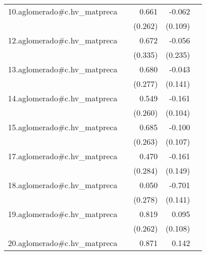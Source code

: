 {\begin{longtable}{l*{4}{D{.}{.}{-1}}}
\addlinespace
10.aglomerado#c.hv\_matpreca&                     &       0.661\sym{*}  &      -0.062         &                     \\
            &                     &     (0.262)         &     (0.109)         &                     \\
\addlinespace
12.aglomerado#c.hv\_matpreca&                     &       0.672\sym{*}  &      -0.056         &                     \\
            &                     &     (0.335)         &     (0.235)         &                     \\
\addlinespace
13.aglomerado#c.hv\_matpreca&                     &       0.680\sym{*}  &      -0.043         &                     \\
            &                     &     (0.277)         &     (0.141)         &                     \\
\addlinespace
14.aglomerado#c.hv\_matpreca&                     &       0.549\sym{*}  &      -0.161         &                     \\
            &                     &     (0.260)         &     (0.104)         &                     \\
\addlinespace
15.aglomerado#c.hv\_matpreca&                     &       0.685\sym{**} &      -0.100         &                     \\
            &                     &     (0.263)         &     (0.107)         &                     \\
\addlinespace
17.aglomerado#c.hv\_matpreca&                     &       0.470         &      -0.161         &                     \\
            &                     &     (0.284)         &     (0.149)         &                     \\
\addlinespace
18.aglomerado#c.hv\_matpreca&                     &       0.050         &      -0.701\sym{***}&                     \\
            &                     &     (0.278)         &     (0.141)         &                     \\
\addlinespace
19.aglomerado#c.hv\_matpreca&                     &       0.819\sym{**} &       0.095         &                     \\
            &                     &     (0.262)         &     (0.108)         &                     \\
\addlinespace
20.aglomerado#c.hv\_matpreca&                     &       0.871         &       0.142         &                     \\

\end{longtable}}
